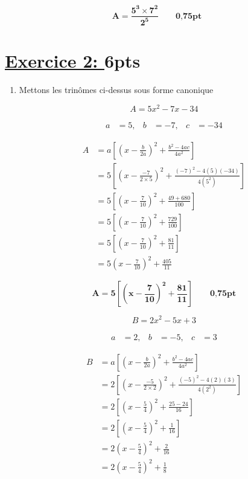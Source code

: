 \documentclass[12pt,a4paper]{article}
\begin{document}
\begin{enumerate}
\begin{tcolorbox}[colback=yellow!20, colframe=black, sharp corners]
    \[
    \mathbf{A = \frac{5^3 \times 7^2}{2^5}}\quad\quad     \textbf{0,75pt}
    \]
\end{tcolorbox}

\end{enumerate}

\section*{\underline{Exercice 2: }6pts}
\begin{enumerate}
    \item Mettons les trinômes ci-dessus sous forme canonique 

\[
A = 5x^2 - 7x - 34
\]

\[
\begin{aligned}
a &= 5, & b &= -7, & c &= -34
\end{aligned}
\]

\[
\begin{aligned}
A &= a \left[\left( x - \frac{b}{2a} \right)^2 + \frac{b^2 - 4ac}{4a^2} \right] \\
  &= 5 \left[\left( x - \frac{-7}{2 \times 5} \right)^2 + \frac{(-7)^2 - 4(5)(-34)}{4(5^2)} \right] \\
  &= 5 \left[\left( x - \frac{7}{10} \right)^2 + \frac{49 + 680}{100} \right] \\
  &= 5 \left[\left( x - \frac{7}{10} \right)^2 + \frac{729}{100} \right] \\
  &= 5 \left[\left( x - \frac{7}{10} \right)^2 + \frac{81}{11} \right] \\
  &= 5 \left( x - \frac{7}{10} \right)^2 + \frac{405}{11}
\end{aligned}
\]

\begin{tcolorbox}[colback=yellow!20, colframe=black, sharp corners]
    \[
    \mathbf{A =  5 \left[\left( x - \frac{7}{10} \right)^2 + \frac{81}{11} \right]}\quad\quad     \textbf{0,75pt}
    \]
\end{tcolorbox}

\[
B = 2x^2 - 5x + 3
\]

\[
\begin{aligned}
a &= 2, & b &= -5, & c &= 3
\end{aligned}
\]

\[
\begin{aligned}
B &= a \left[\left( x - \frac{b}{2a} \right)^2 + \frac{b^2 - 4ac}{4a^2} \right] \\
  &= 2 \left[\left( x - \frac{-5}{2 \times 2} \right)^2 + \frac{(-5)^2 - 4(2)(3)}{4(2^2)} \right] \\
  &= 2 \left[\left( x - \frac{5}{4} \right)^2 + \frac{25 - 24}{16} \right] \\
  &= 2 \left[\left( x - \frac{5}{4} \right)^2 + \frac{1}{16} \right] \\
  &= 2 \left( x - \frac{5}{4} \right)^2 + \frac{2}{16} \\
  &= 2 \left( x - \frac{5}{4} \right)^2 + \frac{1}{8}
\end{aligned}
\]


\end{enumerate}
\end{document}
